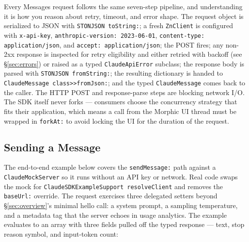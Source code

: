 \documentclass[a4paper,10pt,fleqn]{article}
\begin{document}
Every Messages request follows the same seven-step pipeline, and
understanding it is how you reason about retry, timeout, and
error shape.  The request object is serialized to JSON with
\texttt{STONJSON toString:}; a fresh \texttt{ZnClient} is
configured with \texttt{x-api-key}, \texttt{anthropic-version:
2023-06-01}, \texttt{content-type: application/json}, and
\texttt{accept: application/json}; the POST fires; any non-2xx
response is inspected for retry eligibility and either retried
with backoff (see \S\ref{sec:errors}) or raised as a typed
\texttt{ClaudeApiError} subclass; the response body is parsed
with \texttt{STONJSON fromString:}; the resulting dictionary is
handed to \texttt{ClaudeMessage class>>fromJson:}; and the typed
\texttt{ClaudeMessage} comes back to the caller.  The HTTP POST
and response-parse steps are blocking network I/O.  The SDK
itself never forks --- consumers choose the concurrency strategy
that fits their application, which means a call from the Morphic
UI thread must be wrapped in \texttt{forkAt:} to avoid locking
the UI for the duration of the request.

\subsection{Sending a Message}

The end-to-end example below covers the \texttt{sendMessage:}
path against a \texttt{ClaudeMockServer} so it runs without an
API key or network.  Real code swaps the mock for
\texttt{ClaudeSDKExampleSupport resolveClient} and removes the
\texttt{baseUrl:} override.  The request exercises three
delegated setters beyond \S\ref{sec:overview}'s minimal hello
call: a system prompt, a sampling temperature, and a metadata
tag that the server echoes in usage analytics.  The example
evaluates to an array with three fields pulled off the typed
response --- text, stop reason symbol, and input-token count:
\end{document}
